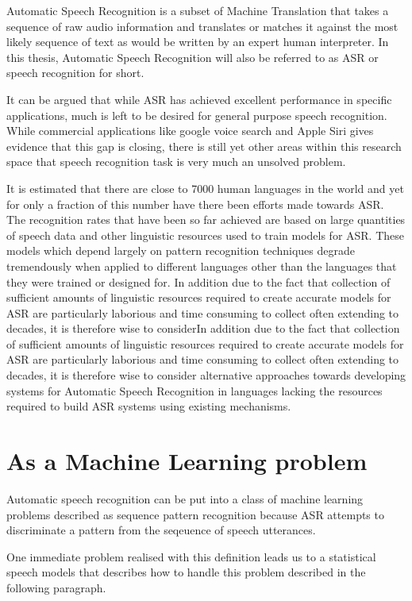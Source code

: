 Automatic Speech Recognition is a subset of Machine Translation that takes a sequence of raw audio information and translates or matches it against the most likely sequence of text as would be written by an expert human interpreter.  In this thesis, Automatic Speech Recognition will also be referred to as 
ASR or speech recognition for short.

It can be argued that while ASR has achieved excellent performance in specific applications, much is left to be desired for general purpose speech recognition. While commercial applications like google voice search and Apple Siri gives evidence that this gap is closing, there is still yet other areas within this research space that speech recognition task is very much an unsolved problem.

It is estimated that there are close to 7000 human languages in the world and yet for only a fraction of this number have there been efforts made towards ASR.  The recognition rates that have been so far achieved are based on large quantities of speech data and other linguistic resources used to train models for ASR. These models which depend largely on pattern recognition techniques degrade tremendously  when applied to different languages other than the languages that they were trained or designed for.  In addition due to the fact that collection of sufficient amounts of linguistic resources required to create accurate models for ASR are particularly laborious and time consuming to collect often extending to decades, it is therefore wise to considerIn addition due to the fact that collection of sufficient amounts of linguistic resources required to create accurate models for ASR are particularly laborious and time consuming to collect often extending to decades, it is therefore wise to consider alternative approaches towards developing systems for Automatic Speech Recognition in languages lacking the resources required to build ASR systems using existing mechanisms.

\section{As a Machine Learning  problem}
\pagestyle{plain}
Automatic speech recognition can be put into a class of machine learning problems described as sequence pattern recognition because ASR attempts to discriminate a pattern from the seqeuence of speech utterances. 

One immediate problem realised with this definition leads us to a statistical speech models that describes how to handle this problem described in the following paragraph.

